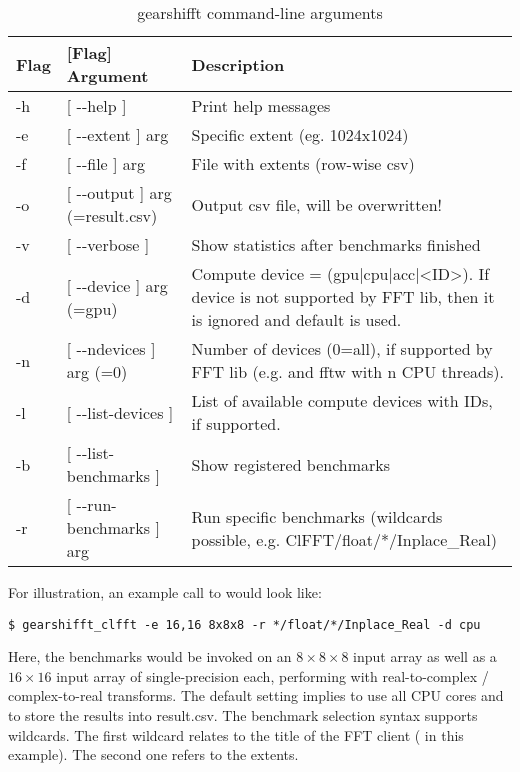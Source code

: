 
\begin{table}[htp]
 \centering
 \caption{gearshifft command-line arguments}
 \label{tab:cmdargs}
  \begin{tabular}{llp{6.4cm}}
\toprule
Flag & [Flag] Argument & Description \\
\midrule
-h&[ -{}-help ]                    &Print help messages \\
-e&[ -{}-extent ] arg              &Specific extent (eg. 1024x1024) \\
-f&[ -{}-file ] arg                &File with extents (row-wise csv) \\
-o&[ -{}-output ] arg (=result.csv)&Output csv file, will be overwritten! \\
-v&[ -{}-verbose ]                 &Show statistics after benchmarks finished \\
-d&[ -{}-device ] arg (=gpu)       &Compute device = (gpu|cpu|acc|<ID>). If 
                                  device is not supported by FFT lib, then it
                                  is ignored and default is used. \\
-n&[ -{}-ndevices ] arg (=0)       &Number of devices (0=all), if supported by 
                                  FFT lib (e.g. \clfft{} and fftw with n CPU 
                                  threads). \\
-l&[ -{}-list-devices ]            &List of available compute devices with IDs,
                                  if supported.  \\
-b&[ -{}-list-benchmarks ]         &Show registered benchmarks \\
-r&[ -{}-run-benchmarks ] arg      &Run specific benchmarks (wildcards 
                                  possible, e.g. ClFFT/float/*/Inplace\_Real)\\
\bottomrule
  \end{tabular}
\end{table}

For illustration, an example call to \gearshifft{} would look like:
\newline
\begin{center}
  \verb!$ gearshifft_clfft -e 16,16 8x8x8 -r */float/*/Inplace_Real -d cpu!
\end{center}
\newline
Here, the \clfft{} benchmarks would be invoked on an $8\times8\times8$ input array as well as a $16\times16$ input array of single-precision each, performing with real-to-complex / complex-to-real transforms. The default setting implies to use all CPU cores and to store the results into result.csv. The \gearshifft{} benchmark selection syntax supports wildcards. The first wildcard \mc{*} relates to the title of the FFT client ( in this example). The second one refers to the extents.

